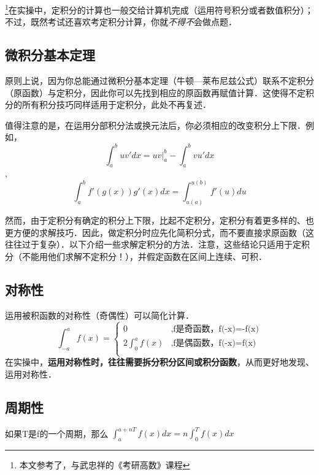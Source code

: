 
\begin{issues}
\issueDraft
\end{issues}

\footnote{本文参考了\cite{同济高}，\cite{Thomas}与武忠祥的《考研高数》课程}在实操中，定积分的计算也一般交给计算机完成（运用符号积分或者数值积分）；不过，既然考试还喜欢考定积分计算，你就\textsl{不得不}会做点题．

\subsection{微积分基本定理}
原则上说，因为你总能通过微积分基本定理（牛顿—莱布尼兹公式）联系不定积分（原函数）与定积分，因此你可以先找到相应的原函数再赋值计算．这使得不定积分的所有积分技巧同样适用于定积分，此处不再复述．

值得注意的是，在运用分部积分法或换元法后，你必须相应的改变积分上下限．例如，$$\int^b_a uv'dx = uv|^b_a-\int^b_a vu'dx$$, 
$$\int^b_a f'(g(x))g'(x)dx = \int ^{u(b)}_{u(a)} f'(u)du$$

然而，由于定积分有确定的积分上下限，比起不定积分，定积分有着更多样的、也更方便的求解技巧．因此，做定积分时应先化简积分式，而不要直接求原函数（这往往过于复杂）．以下介绍一些求解定积分的方法．注意，这些结论只适用于定积分（不能用他们求解不定积分！），并假定函数在区间上连续、可积．

\subsection{对称性}
运用被积函数的对称性（奇偶性）可以简化计算．
$$
\int ^a_{-a} f(x) = 
\left \{
\begin{aligned}
0&,\text{f是奇函数，f(-x)=-f(x)}\\
2\int ^a_0 f(x)&,\text{f是偶函数，f(-x)=f(x)}\\
\end{aligned}
\right.
$$
在实操中，\textbf{运用对称性时，往往需要拆分积分区间或积分函数}，从而更好地发现、运用对称性．

\subsection{周期性}
如果T是f的一个周期，那么 $\int ^{a+nT}_{a} f(x)dx= n\int^{T}_0 f(x)dx$

